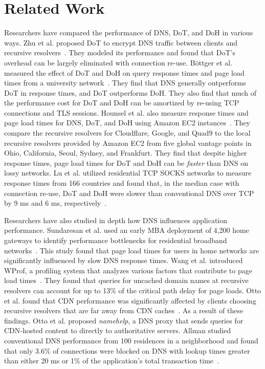 \section{Related Work}\label{sec:related}
Researchers have compared the performance of DNS, DoT, and DoH in various ways.
Zhu et al. proposed DoT to encrypt DNS traffic between clients and recursive resolvers~\cite{zhu2015connection}.
They modeled its performance and found that DoT's overhead can be largely eliminated with connection re-use.
Böttger et al. measured the effect of DoT and DoH on query response times and page load times from a university network~\cite{boettger2019empirical}.
They find that DNS generally outperforms DoT in response times, and DoT outperforms DoH.
They also find that much of the performance cost for DoT and DoH can be amortized by re-using TCP connections and TLS sessions.
Hounsel et al. also measure response times and page load times for DNS, DoT, and DoH using Amazon EC2 instances~\cite{hounsel2020comparing}.
They compare the recursive resolvers for Cloudflare, Google, and Quad9 to the local recursive resolvers provided by Amazon EC2 from five global vantage points in Ohio, California, Seoul, Sydney, and Frankfurt.
They find that despite higher response times, page load times for DoT and DoH can be \emph{faster} than DNS on lossy networks.
Lu et al. utilized residential TCP SOCKS networks to measure response times from 166 countries and found that, in the median case with connection re-use, DoT and DoH were slower than conventional DNS over TCP by 9 ms and 6 ms, respectively~\cite{lu2019end}.

Researchers have also studied in depth how DNS influences application performance.
Sundaresan et al. used an early MBA deployment of 4,200 home gateways to identify performance bottlenecks for residential broadband networks~\cite{sundaresan2013measuring}.
This study found that page load times for users in home networks are significantly influenced by slow DNS response times.
Wang et al. introduced WProf, a profiling system that analyzes various factors that contribute to page load times~\cite{wang2013demystifying}.
They found that queries for uncached domain names at recursive resolvers can account for up to 13\% of the critical path delay for page loads.
Otto et al. found that CDN performance was significantly affected by clients choosing recursive resolvers that are far away from CDN caches~\cite{otto2012content}.
As a result of these findings. Otto et al. proposed \textit{namehelp}, a DNS proxy that sends queries for CDN-hosted content to directly to authoritative servers.
Allman studied conventional DNS performance from 100 residences in a neighborhood and found that only 3.6\% of connections were blocked on DNS with lookup times greater than either 20 ms or 1\% of the application's total transaction time~\cite{allman2020putting}.

